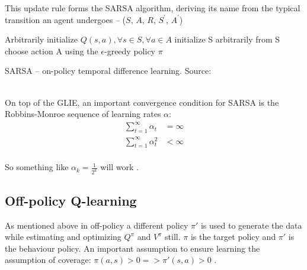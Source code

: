 This update rule forms the SARSA algorithm, deriving its name
from the typical transition an agent undergoes -- 
($S$, $A$, $R$, $S^'$, $A^'$)\\

\begin{algorithm}[H]
\SetAlgoLined
Arbitrarily initialize $Q(s, a), \forall s \in S, \forall a \in A$\;
initialize S arbitrarily\;
from S choose action A using the $\epsilon$-greedy policy $\pi$\;
\caption{SARSA -- on-policy temporal difference learning. Source: \cite{lecture_mfc} }
\label{algorithm:sarsa}
\end{algorithm}\\

On top of the GLIE, an important convergence condition for 
SARSA is the Robbins-Monroe sequence of learning rates $\alpha$: 
\begin{align*}
    \sum^{\infty}_{t=1} \alpha_{t} &= \infty \\
    \sum^{\infty}_{t=1} \alpha_{t}^{2} & < \infty \\
\end{align*}

So something like $\alpha_{k} = \frac{1}{2^{k}}$ will 
work \cite{lecture_mfc}.


\subsection{Off-policy Q-learning}

As mentioned above in off-policy a different policy  $\pi'$ is used to generate the data while estimating and optimizing $Q^{\pi}$ and $V^{\pi}$ still. $\pi$ is the target policy and $\pi'$ is the  behaviour policy. An important assumption to ensure learning the assumption of coverage: $\pi(a, s) > 0 => \pi'(s, a) > 0$ \cite{lecture_mfc}.\\

